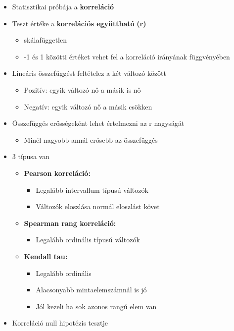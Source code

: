 \documentclass[
  letterpaper,
  DIV=11,
  numbers=noendperiod]{scrreprt}
\providecommand{\tightlist}{%
  \setlength{\itemsep}{0pt}\setlength{\parskip}{0pt}}\usepackage{longtable,booktabs,array}
\begin{document}
\begin{itemize}
\item
  Statisztikai próbája a \textbf{korreláció}
\item
  Teszt értéke a \textbf{korrelációs együttható} \textbf{(r)}

  \begin{itemize}
  \item
    skálafüggetlen~
  \item
    -1 és 1 közötti értéket vehet fel a korreláció irányának
    függvényében
  \end{itemize}
\item
  Lineáris összefüggést feltételez a két változó között

  \begin{itemize}
  \item
    Pozitív: egyik változó nő a másik is nő
  \item
    Negatív: egyik változó nő a másik csökken
  \end{itemize}
\item
  Összefüggés erősségeként lehet értelmezni az r nagyságát

  \begin{itemize}
  \tightlist
  \item
    Minél nagyobb annál erősebb az összefüggés
  \end{itemize}
\item
  3 típusa van

  \begin{itemize}
  \item
    \textbf{Pearson korreláció:}

    \begin{itemize}
    \item
      Legalább intervallum típusú változók
    \item
      Változók eloszlása normál eloszlást követ
    \end{itemize}
  \item
    \textbf{Spearman rang korreláció:}

    \begin{itemize}
    \tightlist
    \item
      Legalább ordinális típusú változók
    \end{itemize}
  \item
    \textbf{Kendall tau:}

    \begin{itemize}
    \item
      Legalább ordinális
    \item
      Alacsonyabb mintaelemszámnál is jó
    \item
      Jól kezeli ha sok azonos rangú elem van
    \end{itemize}
  \end{itemize}
\item
  Korreláció null hipotézis tesztje


\end{itemize}
\end{document}
